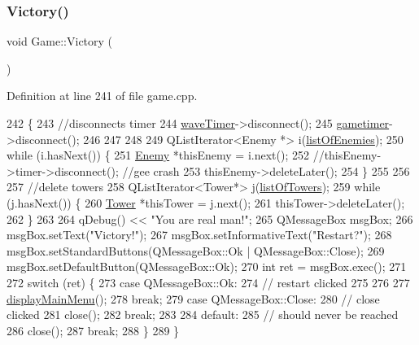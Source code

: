 \subsubsection{\texorpdfstring{Victory()}{Victory()}}
{\footnotesize\ttfamily void Game\+::\+Victory (\begin{DoxyParamCaption}{ }\end{DoxyParamCaption})}



Definition at line 241 of file game.\+cpp.


\begin{DoxyCode}
242 \{
243     \textcolor{comment}{//disconnects timer}
244     \hyperlink{class_game_a06a7795cf068aa5cc3b1debbea3f82ef}{waveTimer}->disconnect();
245     \hyperlink{class_game_a8feee9081542b15a9f2d889a6f1c8257}{gametimer}->disconnect();
246 
247 
248 
249     QListIterator<Enemy *> i(\hyperlink{class_game_ab96914bfc1e59035233105abfb0787fe}{listOfEnemies});
250     \textcolor{keywordflow}{while} (i.hasNext()) \{
251         \hyperlink{class_enemy}{Enemy} *thisEnemy = i.next();
252         \textcolor{comment}{//thisEnemy->timer->disconnect(); //gee crash}
253         thisEnemy->deleteLater();
254     \}
255 
256 
257     \textcolor{comment}{//delete towers}
258     QListIterator<Tower*> j(\hyperlink{class_game_aa0614c45667257e5be61685c33a2bec6}{listOfTowers});
259     \textcolor{keywordflow}{while} (j.hasNext()) \{
260         \hyperlink{class_tower}{Tower} *thisTower = j.next();
261         thisTower->deleteLater();
262     \}
263 
264     qDebug() << \textcolor{stringliteral}{"You are real man!"};
265     QMessageBox msgBox;
266     msgBox.setText(\textcolor{stringliteral}{"Victory!"});
267     msgBox.setInformativeText(\textcolor{stringliteral}{"Restart?"});
268     msgBox.setStandardButtons(QMessageBox::Ok | QMessageBox::Close);
269     msgBox.setDefaultButton(QMessageBox::Ok);
270     \textcolor{keywordtype}{int} ret = msgBox.exec();
271 
272     \textcolor{keywordflow}{switch} (ret) \{
273     \textcolor{keywordflow}{case} QMessageBox::Ok:
274         \textcolor{comment}{// restart clicked}
275 
276 
277         \hyperlink{class_game_af74fd203e3b31917ca9d4769fa608c48}{displayMainMenu}();
278         \textcolor{keywordflow}{break};
279     \textcolor{keywordflow}{case} QMessageBox::Close:
280         \textcolor{comment}{// close clicked}
281         close();
282         \textcolor{keywordflow}{break};
283 
284     \textcolor{keywordflow}{default}:
285         \textcolor{comment}{// should never be reached}
286         close();
287         \textcolor{keywordflow}{break};
288     \}
289 \}
\end{DoxyCode}
\mbox{\label{class_game_a771253a0edc9a31ff64352eb0a4367cb}} 
